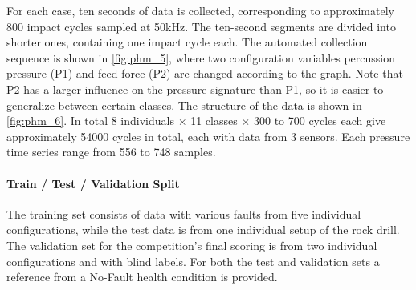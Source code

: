 For each case, ten seconds of data is collected, corresponding to approximately 800 impact cycles sampled at 50kHz. The ten-second segments are divided into shorter ones, containing one impact cycle each. 
The automated collection sequence is shown in \cref{fig:phm_5}, where two configuration variables percussion pressure (P1) and feed force (P2) are changed according to the graph. %
Note that P2 has a larger influence on the pressure signature than P1, so it is easier to generalize between certain classes.
The structure of the data is shown in \cref{fig:phm_6}. In total 8 individuals $\times$ 11 classes $\times$ 300 to 700 cycles each give approximately 54000 cycles in total, each with data from 3 sensors. Each pressure time series range from 556 to 748 samples. 


\paragraph{Train / Test / Validation Split}
The training set consists of data with various faults from five individual configurations, while the test data is from one individual setup of the rock drill. The validation set for the competition's final scoring is from two individual configurations and with blind labels. For both the test and validation sets a reference from a No-Fault health condition is provided.

